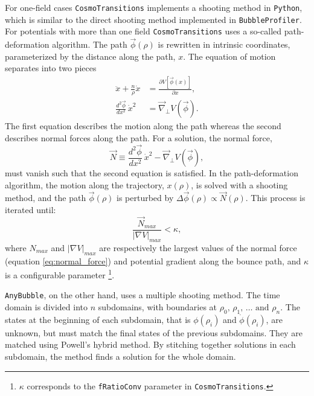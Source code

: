 \documentclass[final,3p,11pt,pdflatex]{elsarticle}
\makeatletter
\renewcommand{\tfrac}{\frac}
\newcommand{\ab}{\texttt{AnyBubble}\@\xspace}
\newcommand{\bp}{\texttt{BubbleProfiler}\@\xspace}
\newcommand{\code}[1]{\ifmmode\text{\nolinkurl{#1}}\else\nolinkurl{#1}\fi}
\newcommand{\cosmo}{\texttt{CosmoTransitions}\@\xspace}
\makeatother
\begin{document}
For one-field cases \cosmo implements a shooting method in
\code{Python}, which is similar to the direct shooting method
implemented in \bp.  For potentials with more than one field
\cosmo\cite{Wainwright:2011kj} uses a so-called path-deformation
algorithm. The path $\vec\phi(\rho)$ is rewritten in intrinsic
coordinates, parameterized by the distance along the path, $x$. The
equation of motion separates into two pieces
\begin{align}
\ddot x +\tfrac{n}{\rho} \dot x &= \frac{\partial V[\vec \phi(x)]}{\partial x},\\
\frac{d^2 \vec{\phi}}{dx^2} \, \dot x^2 &= \vec\nabla_\perp V(\vec\phi).
\end{align}
The first equation describes the motion along the path whereas the second describes normal forces along the path. For a solution, the normal force,
\begin{equation}
\label{eq:normal_force}
\vec N \equiv \frac{d^2 \vec{\phi}}{dx^2} \, \dot x ^2 - \vec\nabla_\perp V(\vec\phi),
\end{equation}
must vanish such that the second equation is satisfied. In the path-deformation algorithm, the motion along the trajectory, $x(\rho)$, is solved with a shooting method, and the path $\vec\phi(\rho)$ is perturbed by $\Delta\vec\phi(\rho) \propto \vec N(\rho)$. This process is iterated until:
%
\begin{equation}
\label{eq:ct_stopping_criteria}
\frac{\vec{N}_{max}}{|\nabla V|_{max}} < \kappa ,
\end{equation}
%
where $N_{max}$ and $|\nabla V|_{max}$ are respectively the largest values of the normal force (equation \ref{eq:normal_force}) and potential gradient along the bounce path, and $\kappa$ is a configurable parameter \footnote{ $\kappa$ corresponds to the \code{fRatioConv} parameter in \cosmo.}.




\ab\cite{Masoumi:2016wot}, on the other hand, uses a multiple shooting method.
The time domain is divided into $n$ subdomains, with boundaries at
$\rho_0,\,\rho_1,\,\ldots\text{ and }\rho_n$. The states at the beginning of
each subdomain, that is $\phi(\rho_i)$ and $\dot\phi(\rho_i)$, are unknown, but
must match the final states of the previous subdomains. They are matched using
Powell's hybrid method. By stitching together solutions in each subdomain, the
method finds a solution for the whole domain.
\end{document}
